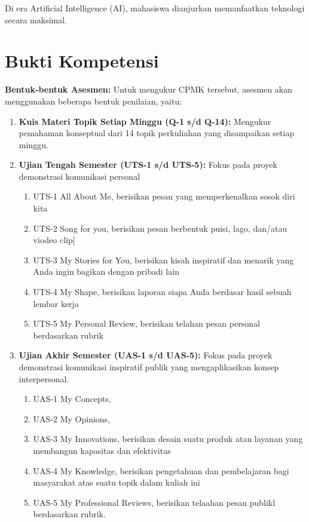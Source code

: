 \documentclass[
  letterpaper,
  DIV=11,
  numbers=noendperiod]{scrreprt}
\providecommand{\tightlist}{%
  \setlength{\itemsep}{0pt}\setlength{\parskip}{0pt}}
\begin{document}
Di era Artificial Intelligence (AI), mahasiswa dianjurkan memanfaatkan
teknologi secara maksimal.

\section*{Bukti Kompetensi}\label{bukti-kompetensi}


\textbf{Bentuk-bentuk Asesmen:} Untuk mengukur CPMK tersebut, asesmen
akan menggunakan beberapa bentuk penilaian, yaitu:

\begin{enumerate}
\def\labelenumi{\arabic{enumi}.}
\tightlist
\item
  \textbf{Kuis Materi Topik Setiap Minggu (Q-1 s/d Q-14):} Mengukur
  pemahaman konseptual dari 14 topik perkuliahan yang disampaikan setiap
  minggu.
\item
  \textbf{Ujian Tengah Semester (UTS-1 s/d UTS-5):} Fokus pada proyek
  demonstrasi komunikasi personal

  \begin{enumerate}
  \def\labelenumii{\arabic{enumii}.}
  \tightlist
  \item
    UTS-1 All About Me, berisikan pesan yang memperkenalkan sosok diri
    kita
  \item
    UTS-2 Song for you, berisikan pesan berbentuk puisi, lago, dan/atau
    viodeo clip{[}
  \item
    UTS-3 My Stories for You, berisikan kisah inspiratif dan menarik
    yang Anda ingin bagikan dengan pribadi lain
  \item
    UTS-4 My Shape, berisikan laporan siapa Anda berdasar hasil sebuah
    lembar kerja
  \item
    UTS-5 My Personal Review, berisikan telahan pesan personal
    berdasarkan rubrik
  \end{enumerate}
\item
  \textbf{Ujian Akhir Semester (UAS-1 s/d UAS-5):} Fokus pada proyek
  demonstrasi komunikasi inspiratif publik yang mengaplikasikan konsep
  interpersonal.

  \begin{enumerate}
  \def\labelenumii{\arabic{enumii}.}
  \tightlist
  \item
    UAS-1 My Concepts,
  \item
    UAS-2 My Opinions,
  \item
    UAS-3 My Innovations, berisikan desain suatu produk atau layanan
    yang membangun kapasitas dan efektivitas
  \item
    UAS-4 My Knowledge, berisikan pengetahuan dan pembelajaran bagi
    masyarakat atas suatu topik dalam kuliah ini
  \item
    UAS-5 My Professional Reviews, berisikan telaahan pesan publikl
    berdasarkan rubrik.
  \end{enumerate}
\end{enumerate}
\end{document}
